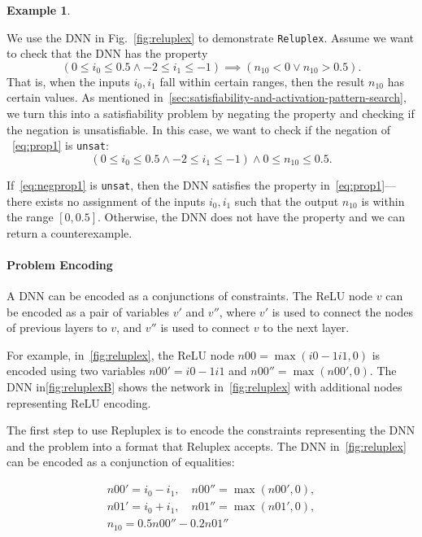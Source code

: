 \documentclass[oneside,11pt,dvipsnames]{book}
\numberwithin{equation}{section}
\theoremstyle{definition}
\newtheorem{example}{Example}[section]
\theoremstyle{remark}
\newcommand{\reluplex}{\texttt{Reluplex}}
\newcommand{\unsat}{\texttt{unsat}}
\begin{document}
  \begin{example}\label{ex:reluplex}

  We use the DNN in Fig.~\ref{fig:reluplex} to demonstrate \reluplex{}. Assume we want to check that the DNN has the property
\begin{equation}\label{eq:prop1}
  (0 \le i_0 \le 0.5 \land -2 \le i_1 \le -1) \implies ( n_{10}< 0 \lor n_{10} > 0.5).
\end{equation}
That is, when the inputs $i_0, i_1$ fall within certain ranges, then the result $n_{10}$ has certain values.
As mentioned in~\ref{sec:satisfiability-and-activation-pattern-search}, we turn this into a satisfiability problem by negating the property and checking if the negation is unsatisfiable.
In this case, we want to check if the negation of ~\autoref{eq:prop1} is \unsat{}:
\begin{equation}\label{eq:negprop1}
    ( 0 \le i_0 \le 0.5 \land -2 \le i_1 \le -1) \land 0 \le n_{10} \le 0.5.
  \end{equation}

If~\autoref{eq:negprop1} is \unsat{}, then the DNN satisfies the property in~\autoref{eq:prop1}---there exists no assignment of the inputs $i_0, i_1$ such that the output $n_{10}$ is within the range $[0, 0.5]$. Otherwise, the DNN does not have the property and we can return a counterexample.


\paragraph{Problem Encoding}  A DNN can be encoded as a conjunctions of constraints.  The ReLU node $v$ can be encoded as a pair of variables $v'$ and $v''$, where $v'$ is used to connect the nodes of previous layers to $v$, and $v''$ is used to connect $v$ to the next layer.

For example, in~\autoref{fig:reluplex}, the ReLU node $n00=\max(i0 -1i1,0)$ is encoded using two variables $n00'=i0 -1i1$ and $n00''=\max(n00',0)$.  The DNN in\autoref{fig:reluplexB} shows the network in~\autoref{fig:reluplex} with additional nodes representing ReLU encoding.



The first step to use Repluplex is to encode the constraints representing the DNN and the problem into a format that Reluplex accepts.
The DNN in~\autoref{fig:reluplex} can be encoded as a conjunction of equalities:

\begin{gather*}%
    n00' = i_0 - i_1,\quad n00'' = \max(n00',0),\\
    n01' = i_0 + i_1, \quad n01'' = \max(n01',0),\\
    n_{10} = 0.5n00'' - 0.2n01''
\end{gather*}


\end{example}
\end{document}
